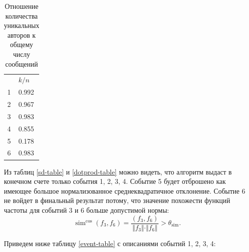\documentclass[14pt,a4paper,oneside]{extarticle}
\DeclareMathOperator{\simu}{sim}
\begin{document}
	
	\begin{table}[H]
	\centering
	\caption{Отношение количества уникальных авторов к общему числу сообщений}
	\begin{tabular}{l | l}
	& $k/n$ \\ 
	1 & 0.992 \\ 
	2 & 0.967 \\ 
	3 & 0.983 \\ 
	4 & 0.855 \\ 
	5 & 0.178 \\ 
	6 & 0.983 \\ 
	\end{tabular}
	
	\label{spam-table}
	\end{table}
	
	Из таблиц \ref{sd-table} и \ref{dotprod-table} можно видеть, что алгоритм выдаст в конечном счете только события 1, 2, 3, 4. Событие 5 будет отброшено как имеющее большое нормализованное среднеквадратичное отклонение. Событие 6 не войдет в финальный результат потому, что значение похожести функций частоты для событий 3 и 6 больше допустимой нормы:
\begin{equation}
	\simu^{\cos}(f_{3}, f_{6}) = \frac{(f_{3}, f_{6})}{ \Vert f_{3} \Vert \cdot \Vert f_{6} \Vert} > \theta_{\simu}.
\end{equation}

Приведем ниже таблицу \ref{event-table} с описаниями событий 1, 2, 3, 4:
	
\end{document}
